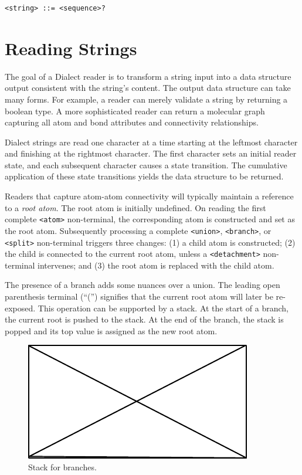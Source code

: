 \documentclass{article}
\def\ttt{\texttt}
\begin{document}
\begin{lstlisting}
<string> ::= <sequence>?
\end{lstlisting}

\section*{Reading Strings}
\label{reading-strings}

The goal of a Dialect reader is to transform a string input into a data structure output consistent with the string's content. The output data structure can take many forms. For example, a reader can merely validate a string by returning a boolean type. A more sophisticated reader can return a molecular graph capturing all atom and bond attributes and connectivity relationships.

Dialect strings are read one character at a time starting at the leftmost character and finishing at the rightmost character. The first character sets an initial reader state, and each subsequent character causes a state transition. The cumulative application of these state transitions yields the data structure to be returned.

Readers that capture atom-atom connectivity will typically maintain a reference to a \textit{root atom}. The root atom is initially undefined. On reading the first complete \ttt{<atom>} non-terminal, the corresponding atom is constructed and set as the root atom. Subsequently processing a complete \ttt{<union>}, \ttt{<branch>}, or \ttt{<split>} non-terminal triggers three changes: (1) a child atom is constructed; (2) the child is connected to the current root atom, unless a \ttt{<detachment>} non-terminal intervenes; and (3) the root atom is replaced with the child atom.

The presence of a branch adds some nuances over a union. The leading open parenthesis terminal (\enquote{(}) signifies that the current root atom will later be re-exposed. This operation can be supported by a stack. At the start of a branch, the current root is pushed to the stack. At the end of the branch, the stack is popped and its top value is assigned as the new root atom.

\begin{figure}
    \centering
    \includegraphics{filler}
    \caption{Stack for branches.}
    \label{fig:branches-stack}
\end{figure}
\end{document}
